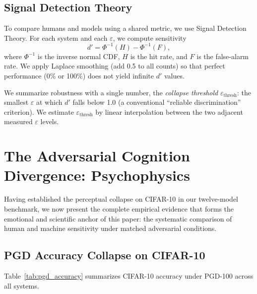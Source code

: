 \documentclass[12pt,a4paper]{article}
\begin{document}
\subsection{Signal Detection Theory}

To compare humans and models using a shared metric, we use Signal Detection
Theory. For each system and each $\varepsilon$, we compute sensitivity
\begin{equation}
  d' = \Phi^{-1}(H) - \Phi^{-1}(F),
  \label{eq:dprime}
\end{equation}
where $\Phi^{-1}$ is the inverse normal CDF, $H$ is the hit rate, and $F$ is
the false-alarm rate. We apply Laplace smoothing (add 0.5 to all counts) so
that perfect performance (0\% or 100\%) does not yield infinite $d'$ values.

We summarize robustness with a single number, the \emph{collapse threshold}
$\varepsilon_{\text{thresh}}$: the smallest $\varepsilon$ at which $d'$ falls
below 1.0 (a conventional ``reliable discrimination'' criterion). We estimate
$\varepsilon_{\text{thresh}}$ by linear interpolation between the two adjacent
measured $\varepsilon$ levels.

\section{The Adversarial Cognition Divergence: Psychophysics}
\label{sec:psychophysics}

Having established the perceptual collapse on CIFAR-10 in our twelve-model
benchmark, we now present the complete empirical evidence that forms the
emotional and scientific anchor of this paper: the systematic comparison of
human and machine sensitivity under matched adversarial conditions.

\subsection{PGD Accuracy Collapse on CIFAR-10}

Table~\ref{tab:pgd_accuracy} summarizes CIFAR-10 accuracy under PGD-100
across all systems.
\end{document}
